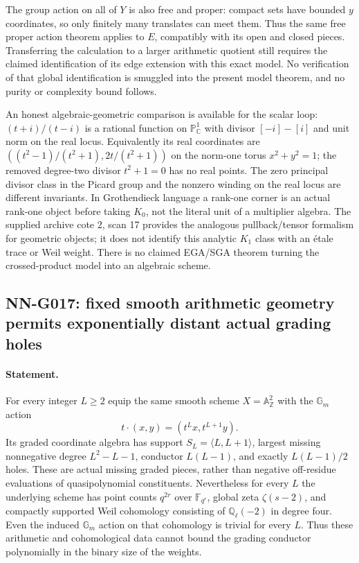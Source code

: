 The group action on all of $Y$ is also free and proper: compact
sets have bounded $y$ coordinates, so only finitely many translates
can meet them. Thus the same free proper action theorem applies
to $E$, compatibly with its open and closed pieces. Transferring
the calculation to a larger arithmetic quotient still requires the
claimed identification of its edge extension with this exact model.
No verification of that global identification is smuggled into
the present model theorem, and no purity or complexity bound follows.

An honest algebraic-geometric comparison is available for the
scalar loop: $(t+i)/(t-i)$ is a rational function on
$\mathbb P^1_{\mathbb C}$ with divisor $[-i]-[i]$ and unit norm
on the real locus. Equivalently its real coordinates are
$((t^2-1)/(t^2+1),2t/(t^2+1))$ on the norm-one torus
$x^2+y^2=1$; the removed degree-two divisor $t^2+1=0$ has no
real points. The zero principal divisor class in the Picard
group and the nonzero winding on the real locus are different
invariants. In Grothendieck language a rank-one corner is an
actual rank-one object before taking $K_0$, not the literal unit
of a multiplier algebra. The supplied archive cote 2, scan 17
provides the analogous pullback/tensor formalism for geometric
objects; it does not identify this analytic $K_1$ class with an
\'{e}tale trace or Weil weight. There is no claimed EGA/SGA theorem
turning the crossed-product model into an algebraic scheme.

\subsection{NN-G017: fixed smooth arithmetic geometry permits exponentially distant actual grading holes}
\paragraph{Statement.}
For every integer $L\ge2$ equip the same smooth scheme
$X=\mathbb A^2_{\mathbb Z}$ with the $\mathbb G_m$ action
\[
t\cdot(x,y)=(t^Lx,t^{L+1}y).
\]
Its graded coordinate algebra has support
$S_L=\langle L,L+1\rangle$, largest missing nonnegative degree
$L^2-L-1$, conductor $L(L-1)$, and exactly $L(L-1)/2$ holes.
These are actual missing graded pieces, rather than negative
off-residue evaluations of quasipolynomial constituents.
Nevertheless for every $L$ the underlying scheme has point counts
$q^{2r}$ over $\mathbb F_{q^r}$, global zeta $\zeta(s-2)$,
and compactly supported Weil cohomology consisting of
$\mathbb Q_\ell(-2)$ in degree four. Even the induced
$\mathbb G_m$ action on that cohomology is trivial for every $L$.
Thus these arithmetic and cohomological data cannot bound the
grading conductor polynomially in the binary size of the weights.

